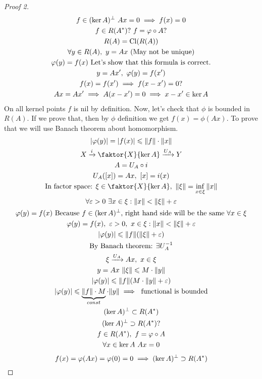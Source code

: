 \begin{proof}[Proof 2]
  \begin{gather*}
    f \in (\ker{A})^\perp\ Ax = 0 \implies f(x) = 0 \\
    f \in R(A^*) ?\ f = \phi \circ A ? \\
    R(A) = \cl{R(A)} \\
    \forall y \in R(A),\ y = Ax \text{ (May not be unique)} \\
    \phi(y) = f(x) \text{ Let's show that this formula is correct.} \\
    y = A x',\ \phi(y) = f(x') \\
    f(x) = f(x') \implies f(x - x') = 0? \\
    Ax = Ax' \implies A(x - x') = 0 \implies x - x' \in \ker{A}
  \end{gather*}
  On all kernel points $f$ is nil by definition.
  Now, let's check that $\phi$ is bounded in $R(A)$. If we prove that, then
  by $\phi$ definition we get $f(x) = \phi(Ax)$. To prove that we will use
  Banach theorem about homomorphism.
  \begin{gather*}
    |\phi(y)| = |f(x)| \leq \|f\| \cdot \|x\| \\
    X \xrightarrow{i} \faktor{X}{\ker{A}} \xrightarrow{U_A} Y \\
    A = U_A \circ i \\
    U_A([x]) = Ax,\ [x] = i(x) \\
    \text{In factor space: } \xi \in \faktor{X}{\ker{A}},\ \|\xi\| = \inf_{x \in
      \xi} \|x\| \\
    \forall \epsilon > 0\ \exists x \in \xi : \|x\| < \|\xi\| + \epsilon \\ 
    \phi(y) = f(x) \text{ Because $f \in (\ker{A})^\perp$, right hand side will be
      the same $\forall x \in \xi$} \\
    \phi(y) = f(x),\ \epsilon > 0,\ x \in \xi : \|x\| < \|\xi\| + \epsilon \\
    |\phi(y)| \leq \|f\| (\|\xi\| + \epsilon) \\
    \text{By Banach theorem: } \exists U_A^{-1} \\
    \xi \xrightarrow{U_A} Ax,\ x \in \xi \\
    y = Ax\ \|\xi\| \leq M \cdot \|y\| \\
    |\phi(y)| \leq \|f\| (M \cdot \|y\| + \epsilon) \\
    |\phi(y)| \leq \underbrace{\|f\| \cdot M}_{const} \cdot \|y\| \implies \text{
      functional is bounded} \\
    (\ker{A})^\perp \subset R(A^*) \\
    (\ker{A})^\perp \supset R(A^*) ?\\
    f \in R(A^*),\ f = \phi \circ A \\
    \forall x \in \ker{A}\ Ax = 0
  \end{gather*}
  \[   
    f(x) = \phi(Ax) = \phi(0) = 0 \implies (\ker{A})^\perp \supset R(A^*) \qedhere
  \]
\end{proof}